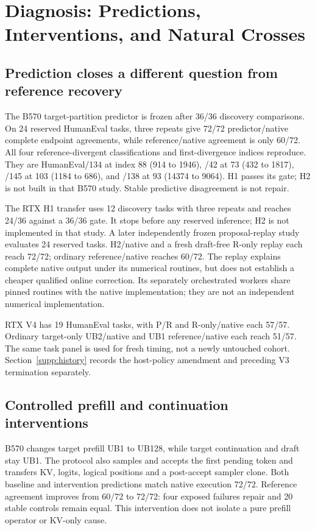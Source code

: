 \section{Diagnosis: Predictions, Interventions, and Natural Crosses}
\label{supp:diagnosis}
\subsection{Prediction closes a different question from reference recovery}
\label{supp:prediction}
The B570 target-partition predictor is frozen after 36/36 discovery comparisons. On 24 reserved HumanEval tasks, three repeats give 72/72 predictor/native complete endpoint agreements, while reference/native agreement is only 60/72. All four reference-divergent classifications and first-divergence indices reproduce. They are HumanEval/134 at index 88 (914 to 1946), /42 at 73 (432 to 1817), /145 at 103 (1184 to 686), and /138 at 93 (14374 to 9064). H1 passes its gate; H2 is not built in that B570 study. Stable predictive disagreement is not repair.

The RTX H1 transfer uses 12 discovery tasks with three repeats and reaches 24/36 against a 36/36 gate. It stops before any reserved inference; H2 is not implemented in that study. A later independently frozen proposal-replay study evaluates 24 reserved tasks. H2/native and a fresh draft-free R-only replay each reach 72/72; ordinary reference/native reaches 60/72. The replay explains complete native output under its numerical routines, but does not establish a cheaper qualified online correction. Its separately orchestrated workers share pinned routines with the native implementation; they are not an independent numerical implementation.

RTX V4 has 19 HumanEval tasks, with P/R and R-only/native each 57/57. Ordinary target-only UB2/native and UB1 reference/native each reach 51/57. The same task panel is used for fresh timing, not a newly untouched cohort. Section~\ref{supp:history} records the host-policy amendment and preceding V3 termination separately.

\subsection{Controlled prefill and continuation interventions}
\label{supp:controlled_interventions}
B570 changes target prefill UB1 to UB128, while target continuation and draft stay UB1. The protocol also samples and accepts the first pending token and transfers KV, logits, logical positions and a post-accept sampler clone. Both baseline and intervention predictions match native execution 72/72. Reference agreement improves from 60/72 to 72/72: four exposed failures repair and 20 stable controls remain equal. This intervention does not isolate a pure prefill operator or KV-only cause.

